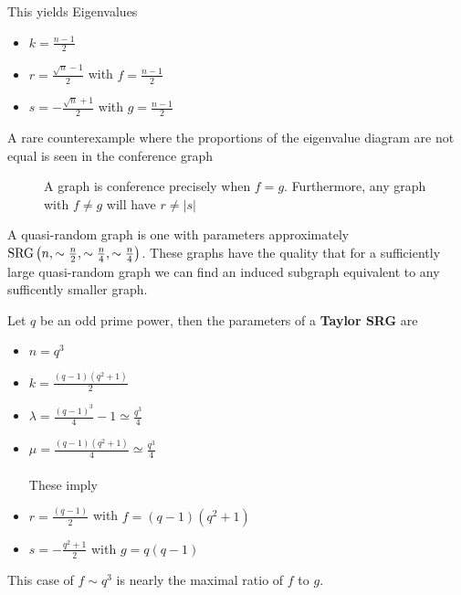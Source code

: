 This yields Eigenvalues
\begin{itemize}
	\item  \(k = \frac{n-1}{2}\)
		\item \(r= \frac{\sqrt{n} -1}{2} \) with \(f = \frac{n-1}{2}\)
			\item \(s = -\frac{\sqrt{n} +1}{2}\) with \(g = \frac{n-1}{2} \)
\end{itemize}
A rare counterexample where the proportions of the eigenvalue diagram are not equal is seen in the conference graph
\begin{figure}[ht]
    \centering
    \caption{A graph is conference precisely when \(f = g\). Furthermore, any graph with \( f\neq g\) will have \(r \neq \left| s \right| \)}
    \label{fig:coneig}
\end{figure}
\begin{recall}
	A quasi-random graph is one with parameters approximately \( \operatorname{SRG} \left( n, \sim \frac{n}{2}, \sim \frac{n}{4}, \sim \frac{n}{4} \right) \). These graphs have the quality that for a sufficiently large quasi-random graph we can find an induced subgraph equivalent to  any sufficently smaller graph.
\end{recall}
\begin{definition}
	Let \(q\) be an odd prime power, then the parameters of a \textbf{Taylor SRG} are
	\begin{itemize}
		\item \(n = q^3\)
		\item \(k = \frac{\left( q-1 \right) \left( q^2 + 1 \right)}{2} \)
		\item \(\lambda = \frac{\left( q-1 \right) ^3}{4} -1 \simeq \frac{q^3}{4}\)
		\item \( \mu = \frac{\left( q-1 \right) \left( q^2 + 1 \right)}{4} \simeq \frac{q^3}{4} \)
	\\ \\	These imply
		\item \(r = \frac{\left( q-1 \right) }{2}\) with \(f = \left( q-1 \right) \left( q^2 + 1 \right) \)
		\item \(s = - \frac{q^2 + 1}{2}\) with \( g = q \left( q-1 \right) \)
	\end{itemize}
\end{definition}
This case of \(f \sim q^3\) is nearly the maximal ratio of \(f\) to \(g\).
